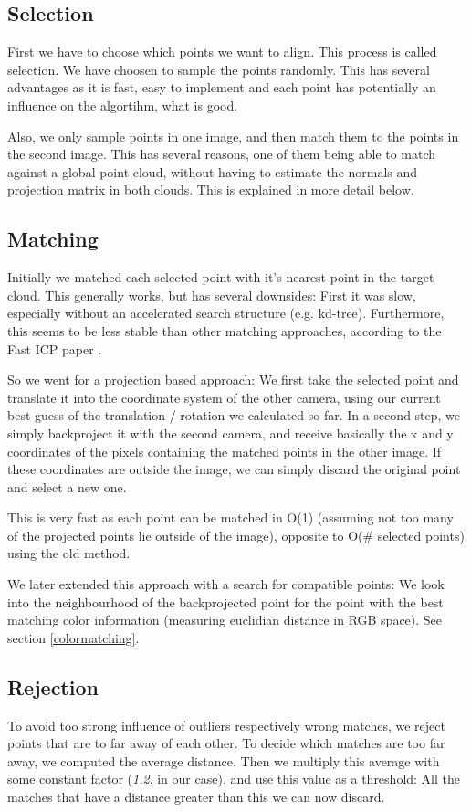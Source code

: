 \documentclass[10pt,twocolumn,letterpaper]{article}
\begin{document}
\subsection{Selection}
First we have to choose which points we want to align. This process is called selection. 
We have choosen to sample the points randomly. 
This has several advantages as it is fast, easy to implement and each point has potentially an influence on the algortihm, what is good.

Also, we only sample points in one image, and then match them to the points in the second image. This has several reasons, one of them
being able to match against a global point cloud, without having to estimate the normals and projection matrix in both clouds.
This is explained in more detail below.

\subsection{Matching}
\label{backprojection}

Initially we matched each selected point with it's nearest point in the target cloud. 
This generally works, but has several downsides: First it was slow, especially without an accelerated search structure (e.g. kd-tree). 
Furthermore, this seems to be less stable than other matching approaches, according to the Fast ICP paper \cite{fasticp}.

So we went for a projection based approach: We first take the selected point and translate it into the coordinate system of the other camera,
using our current best guess of the translation / rotation we calculated so far. In a second step, we simply backproject it with the second camera,
and receive basically the x and y coordinates of the pixels containing the matched points in the other image. If these coordinates are outside the image,
we can simply discard the original point and select a new one.

This is very fast as each point can be matched in O(1) (assuming not too many of the projected points lie outside of the image), opposite to
O(\# selected points) using the old method.

We later extended this approach with a search for compatible points: We look into the neighbourhood of the backprojected point
for the point with the best matching color information (measuring euclidian distance in RGB space). See section \ref{colormatching}.

\subsection{Rejection}
To avoid too strong influence of outliers respectively wrong matches, we reject points that are to far away of each other. 
To decide which matches are too far away, we computed the average distance. Then we multiply this average with some constant
factor (\textit{1.2}, in our case), and use this value as a threshold: All the matches that have a distance greater than this
we can now discard.
\end{document}
